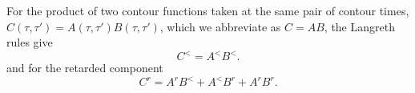 \documentclass{article}
\begin{document}
For the product of two contour functions taken at the same pair of contour times,
$C(\tau,\tau') = A(\tau,\tau')B(\tau,\tau')$, which we abbreviate as $C = AB$,
the Langreth rules give
\begin{equation}
C^{<} = A^{<} B^{<} .
\label{eq:pl}
\end{equation}
and for the retarded component
\begin{equation}
C^{r} = A^{r} B^{<} + A^{<} B^{r} + A^{r} B^{r} .
\label{eq:pr}
\end{equation}
\end{document}
